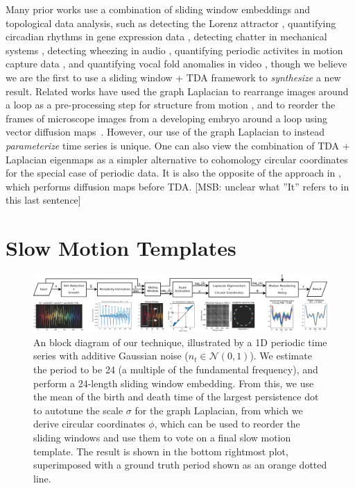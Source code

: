 \documentclass{article}
\newcommand{\matt}[1]{{\color{purple}[MSB: #1]}}
\begin{document}
Many prior works use a combination of sliding window embeddings and topological data analysis, such as detecting the Lorenz attractor \cite{de2012topological}, quantifying circadian rhythms in gene expression data \cite{perea2015sliding}, detecting chatter in mechanical systems \cite{khasawneh2016chatter}, detecting wheezing in audio \cite{emrani2014real}, quantifying periodic activites in motion capture data \cite{vejdemo2015cohomological, venkataraman2016persistent}, and quantifying vocal fold anomalies in video \cite{tralie2017quasi}, though we believe we are the first to use a sliding window + TDA framework to {\em synthesize} a new result. Related works have used the graph Laplacian to rearrange images around a loop as a pre-processing step for structure from motion \cite{averbuch2015ringit}, and to reorder the frames of microscope images from a developing embryo around a loop using vector diffusion maps~\cite{dsilva2015diffusionvecordering}.  However, our use of the graph Laplacian to instead {\em parameterize} time series is unique. One can also view the combination of TDA + Laplacian eigenmaps as a simpler alternative to cohomology circular coordinates \cite{de2011persistent,vejdemo2015cohomological} for the special case of periodic data.  It is also the opposite of the approach in \cite{bendich2011improving}, which performs diffusion maps before TDA. \matt{unclear what ''It'' refers to in this last sentence}


\section{Slow Motion Templates}
\label{sec:methods}

\begin{figure}[h!]
\centering
\includegraphics[width=\textwidth]{BlockDiagram.pdf}
\caption{An block diagram of our technique, illustrated by a 1D periodic time series with additive Gaussian noise ($n_t \in \mathcal{N}(0, 1)$).  We estimate the period to be 24 (a multiple of the fundamental frequency), and perform a 24-length sliding window embedding.  From this, we use the mean of the birth and death time of the largest persistence dot to autotune the scale $\sigma$ for the graph Laplacian, from which we derive circular coordinates $\phi$, which can be used to reorder the sliding windows and use them to vote on a final slow motion template.  The result is shown in the bottom rightmost plot, superimposed with a ground truth period shown as an orange dotted line.}
\label{fig:ConceptFigure}
\end{figure}
\end{document}
